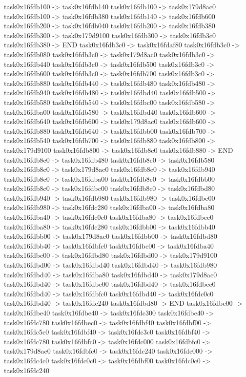 {	task0x16fdb100 -> task0x16fdb140
	task0x16fdb100 -> task0x179d8ac0
	task0x16fdb100 -> task0x16fdb380
	task0x16fdb140 -> task0x16fdb600
	task0x16fdb200 -> task0x16fdb040
	task0x16fdb200 -> task0x16fdb380
	task0x16fdb300 -> task0x179d9100
	task0x16fdb300 -> task0x16fdb3c0
	task0x16fdb380 -> END
	task0x16fdb3c0 -> task0x16fdaf80
	task0x16fdb3c0 -> task0x16fdb080
	task0x16fdb3c0 -> task0x179d8ac0
	task0x16fdb3c0 -> task0x16fdb440
	task0x16fdb3c0 -> task0x16fdb500
	task0x16fdb3c0 -> task0x16fdb600
	task0x16fdb3c0 -> task0x16fdb700
	task0x16fdb3c0 -> task0x16fdb880
	task0x16fdb440 -> task0x16fdb480
	task0x16fdb480 -> task0x16fdb940
	task0x16fdb480 -> task0x16fdbd40
	task0x16fdb500 -> task0x16fdb580
	task0x16fdb540 -> task0x16fdbc00
	task0x16fdb580 -> task0x16fdba00
	task0x16fdb580 -> task0x16fdbd40
	task0x16fdb600 -> task0x16fdb640
	task0x16fdb600 -> task0x179d8ac0
	task0x16fdb600 -> task0x16fdb880
	task0x16fdb640 -> task0x16fdbb00
	task0x16fdb700 -> task0x16fdb540
	task0x16fdb700 -> task0x16fdb880
	task0x16fdb800 -> task0x179d9100
	task0x16fdb800 -> task0x16fdb8c0
	task0x16fdb880 -> END
	task0x16fdb8c0 -> task0x16fdb480
	task0x16fdb8c0 -> task0x16fdb580
	task0x16fdb8c0 -> task0x179d8ac0
	task0x16fdb8c0 -> task0x16fdb940
	task0x16fdb8c0 -> task0x16fdba00
	task0x16fdb8c0 -> task0x16fdbb00
	task0x16fdb8c0 -> task0x16fdbc00
	task0x16fdb8c0 -> task0x16fdbd80
	task0x16fdb940 -> task0x16fdb980
	task0x16fdb980 -> task0x16fdbe00
	task0x16fdb980 -> task0x16fdc280
	task0x16fdba00 -> task0x16fdba80
	task0x16fdba40 -> task0x16fdc0c0
	task0x16fdba80 -> task0x16fdbec0
	task0x16fdba80 -> task0x16fdc280
	task0x16fdbb00 -> task0x16fdbb40
	task0x16fdbb00 -> task0x179d8ac0
	task0x16fdbb00 -> task0x16fdbd80
	task0x16fdbb40 -> task0x16fdbfc0
	task0x16fdbc00 -> task0x16fdba40
	task0x16fdbc00 -> task0x16fdbd80
	task0x16fdbd00 -> task0x179d9100
	task0x16fdbd00 -> task0x16fdbd40
	task0x16fdbd40 -> task0x16fdb980
	task0x16fdbd40 -> task0x16fdba80
	task0x16fdbd40 -> task0x179d8ac0
	task0x16fdbd40 -> task0x16fdbe00
	task0x16fdbd40 -> task0x16fdbec0
	task0x16fdbd40 -> task0x16fdbfc0
	task0x16fdbd40 -> task0x16fdc0c0
	task0x16fdbd40 -> task0x16fdc240
	task0x16fdbd80 -> END
	task0x16fdbe00 -> task0x16fdbe40
	task0x16fdbe40 -> task0x16fdc300
	task0x16fdbe40 -> task0x16fdc780
	task0x16fdbec0 -> task0x16fdbf40
	task0x16fdbf00 -> task0x16fdc5c0
	task0x16fdbf40 -> task0x16fdc3c0
	task0x16fdbf40 -> task0x16fdc780
	task0x16fdbfc0 -> task0x16fdc000
	task0x16fdbfc0 -> task0x179d8ac0
	task0x16fdbfc0 -> task0x16fdc240
	task0x16fdc000 -> task0x16fdc4c0
	task0x16fdc0c0 -> task0x16fdbf00
	task0x16fdc0c0 -> task0x16fdc240
}
